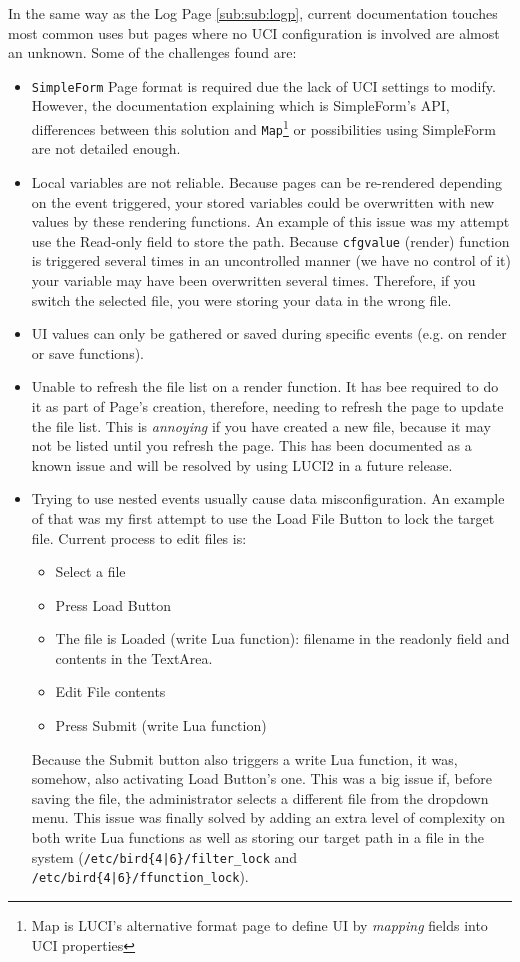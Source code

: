 In the same way as the Log Page \ref{sub:sub:logp}, current documentation touches most common uses but pages where no UCI configuration is involved are almost an unknown. Some of the challenges found are:
\begin{itemize}
    \item \texttt{SimpleForm} Page format is required due the lack of UCI settings to modify. However, the documentation explaining which is SimpleForm's API, differences between this solution and \texttt{Map}\footnote{Map is LUCI's alternative format page to define UI by \textit{mapping} fields into UCI properties} or possibilities using SimpleForm are not detailed enough.
    \item Local variables are not reliable. Because pages can be re-rendered depending on the event triggered, your stored variables could be overwritten with new values by these rendering functions.
    An example of this issue was my attempt use the Read-only field to store the path. Because \texttt{cfgvalue} (render) function is triggered several times in an uncontrolled manner (we have no control of it) your variable may have been overwritten several times. Therefore, if you switch the selected file, you were storing your data in the wrong file.
    \item UI values can only be gathered or saved during specific events (e.g. on render or save functions).
    \item Unable to refresh the file list on a render function. It has bee required to do it as part of Page's creation, therefore, needing to refresh the page to update the file list. This is \textit{annoying} if you have created a new file, because it may not be listed until you refresh the page.
    This has been documented as a known issue and will be resolved by using LUCI2 in a future release. 
    \item Trying to use nested events usually cause data misconfiguration.
    An example of that was my first attempt to use the Load File Button to lock the target file. Current process to edit files is: 
    \begin{itemize}
        \item Select a file
        \item Press Load Button
        \item The file is Loaded (write Lua function): filename in the readonly field and contents in the TextArea.
        \item Edit File contents
        \item Press Submit (write Lua function)
    \end{itemize}
    Because the Submit button also triggers a write Lua function, it was, somehow, also activating Load Button's one. This was a big issue if, before saving the file, the administrator selects a different file from the dropdown menu.
    This issue was finally solved by adding an extra level of complexity on both write Lua functions as well as storing our target path in a file in the system (\texttt{/etc/bird\{4|6\}/filter\_lock} and \texttt{/etc/bird\{4|6\}/ffunction\_lock}).
\end{itemize}

